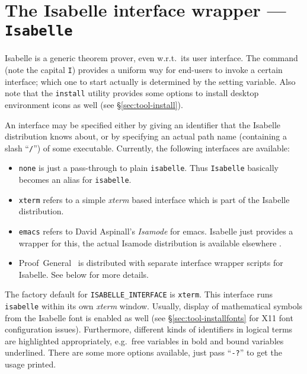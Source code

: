 \section{The Isabelle interface wrapper --- \texttt{Isabelle}} \label{sec:interface}

Isabelle is a generic theorem prover, even w.r.t.\ its user interface.  The
 command (note the capital \texttt{I}) provides a uniform
way for end-users to invoke a certain interface; which one to start actually
is determined by the  setting variable.  Also note
that the \texttt{install} utility provides some options to install desktop
environment icons as well (see \S\ref{sec:tool-install}).

An interface may be specified either by giving an identifier that the Isabelle
distribution knows about, or by specifying an actual path name (containing a
slash ``\texttt{/}'') of some executable.  Currently, the following interfaces
are available:

\begin{itemize}
\item \texttt{none} is just a pass-through to plain \texttt{isabelle}. Thus
  \texttt{Isabelle} basically becomes an alias for \texttt{isabelle}.
  
\item \texttt{xterm} refers to a simple \textsl{xterm} based interface which
  is part of the Isabelle distribution.
  
\item \texttt{emacs} refers to David Aspinall's \emph{Isamode} for emacs.  Isabelle just provides a wrapper for this,
  the actual Isamode distribution is available elsewhere \cite{isamode}.
  
\item Proof~General~\cite{proofgeneral} is
  distributed with separate interface wrapper scripts for Isabelle.  See below
  for more details.
\end{itemize}

The factory default for \texttt{ISABELLE_INTERFACE} is \texttt{xterm}.  This
interface runs \texttt{isabelle} within its own \textsl{xterm} window.
Usually, display of mathematical symbols from the Isabelle font is enabled as
well (see \S\ref{sec:tool-installfonts} for X11 font configuration issues).
Furthermore, different kinds of identifiers in logical terms are highlighted
appropriately, e.g.\ free variables in bold and bound variables underlined.
There are some more options available, just pass ``\texttt{-?}'' to get the
usage printed.

